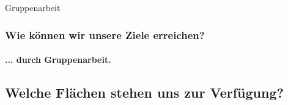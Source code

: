 \documentclass[aspectratio=169]{beamer}
\begin{document}

\begin{frame}{Gruppenarbeit}
	\frametitle{Wie können wir unsere Ziele erreichen?} 
	\framesubtitle{... durch Gruppenarbeit.}
\end{frame}
\subsection[Flächen]{Welche Flächen stehen uns zur Verfügung?}
\end{document}
